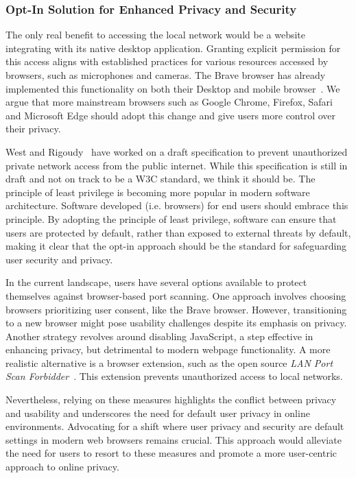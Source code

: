 \subsubsection{Opt-In Solution for Enhanced Privacy and Security}

The only real benefit to accessing the local network would be a website integrating with its native desktop application. 
Granting explicit permission for this access aligns with established practices for various resources accessed by browsers, such as microphones and cameras.
The Brave browser has already implemented this functionality on both their Desktop and mobile browser~. 
We argue that more mainstream browsers such as Google Chrome, Firefox, Safari and Microsoft Edge should adopt this change and give users more control over their privacy. 

West and Rigoudy~ have worked on a draft specification to prevent unauthorized private network access from the public internet. 
While this specification is still in draft and not on track to be a W3C standard, we think it should be. 
The principle of least privilege is becoming more popular in modern software architecture. 
Software developed (i.e. browsers) for end users should embrace this principle. 
By adopting the principle of least privilege, software can ensure that users are protected by default, rather than exposed to external threats by default, making it clear that the opt-in approach should be the standard for safeguarding user security and privacy.

In the current landscape, users have several options available to protect themselves against browser-based port scanning. 
One approach involves choosing browsers prioritizing user consent, like the Brave browser. 
However, transitioning to a new browser might pose usability challenges despite its emphasis on privacy.
Another strategy revolves around disabling JavaScript, a step effective in enhancing privacy, but detrimental to modern webpage functionality.
A more realistic alternative is a browser extension, such as the open source \emph{LAN Port Scan Forbidder}~. 
This extension prevents unauthorized access to local networks. 

Nevertheless, relying on these measures highlights the conflict between privacy and usability and underscores the need for default user privacy in online environments.
Advocating for a shift where user privacy and security are default settings in modern web browsers remains crucial. 
This approach would alleviate the need for users to resort to these measures and promote a more user-centric approach to online privacy.

